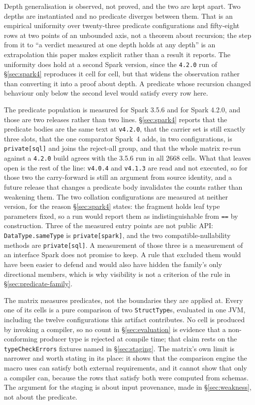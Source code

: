 Depth generalisation is observed, not proved, and the two are kept apart. Two depths are instantiated and no predicate diverges between them. That is an empirical uniformity over twenty-three predicate configurations and fifty-eight rows at two points of an unbounded axis, not a theorem about recursion; the step from it to ``a verdict measured at one depth holds at any depth'' is an extrapolation this paper makes explicit rather than a result it reports. The uniformity does hold at a second Spark version, since the \texttt{4.2.0} run of \S\ref{sec:spark4} reproduces it cell for cell, but that widens the observation rather than converting it into a proof about depth. A predicate whose recursion changed behaviour only below the second level would satisfy every row here.

The predicate population is measured for Spark 3.5.6 and for Spark 4.2.0, and those are two releases rather than two lines. \S\ref{sec:spark4} reports that the predicate bodies are the same text at \texttt{v4.2.0}, that the carrier set is still exactly three slots, that the one comparator Spark~4 adds, in two configurations, is \texttt{private[sql]} and joins the reject-all group, and that the whole matrix re-run against a \texttt{4.2.0} build agrees with the 3.5.6 run in all 2668 cells. What that leaves open is the rest of the line: \texttt{v4.0.4} and \texttt{v4.1.3} are read and not executed, so for those two the carry-forward is still an argument from source identity, and a future release that changes a predicate body invalidates the counts rather than weakening them. The two collation configurations are measured at neither version, for the reason \S\ref{sec:spark4} states: the fragment holds leaf type parameters fixed, so a run would report them as indistinguishable from \texttt{==} by construction. Three of the measured entry points are not public API: \texttt{DataType.sameType} is \texttt{private[spark]}, and the two compatible-nullability methods are \texttt{private[sql]}. A measurement of those three is a measurement of an interface Spark does not promise to keep. A rule that excluded them would have been easier to defend and would also have hidden the family's only directional members, which is why visibility is not a criterion of the rule in \S\ref{sec:predicate-family}.

The matrix measures predicates, not the boundaries they are applied at. Every one of its cells is a pure comparison of two \texttt{StructType}s, evaluated in one JVM, including the twelve configurations this artifact contributes. No cell is produced by invoking a compiler, so no count in \S\ref{sec:evaluation} is evidence that a non-conforming producer type is rejected at compile time; that claim rests on the \texttt{typeCheckErrors} fixtures named in \S\ref{sec:staging}. The matrix's own limit is narrower and worth stating in its place: it shows that the comparison engine the macro uses can satisfy both external requirements, and it cannot show that only a compiler can, because the rows that satisfy both were computed from schemas. The argument for the staging is about input provenance, made in \S\ref{sec:weakness}, not about the predicate.

